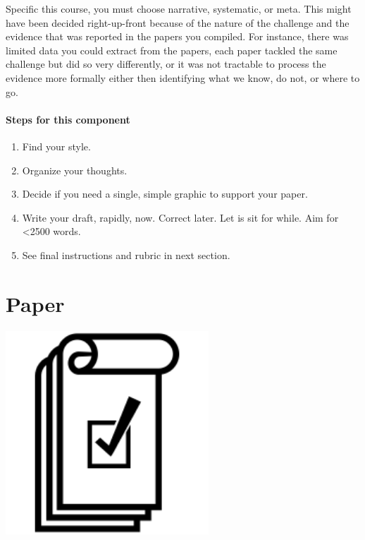 \documentclass[
]{book}
\providecommand{\tightlist}{%
  \setlength{\itemsep}{0pt}\setlength{\parskip}{0pt}}
\begin{document}
Specific this course, you must choose narrative, systematic, or meta. This might have been decided right-up-front because of the nature of the challenge and the evidence that was reported in the papers you compiled. For instance, there was limited data you could extract from the papers, each paper tackled the same challenge but did so very differently, or it was not tractable to process the evidence more formally either then identifying what we know, do not, or where to go.

\hypertarget{steps-for-this-component-1}{%
\subsubsection*{Steps for this component}\label{steps-for-this-component-1}}

\begin{enumerate}
\def\labelenumi{\arabic{enumi}.}
\tightlist
\item
  Find your style.\\
\item
  Organize your thoughts.
\item
  Decide if you need a single, simple graphic to support your paper.\\
\item
  Write your draft, rapidly, now. Correct later. Let is sit for while. Aim for \textless2500 words.\\
\item
  See final instructions and rubric in next section.
\end{enumerate}

\hypertarget{paper}{%
\chapter{Paper}\label{paper}}

\includegraphics[width=3in,height=\textheight]{./paper.png}
\end{document}
